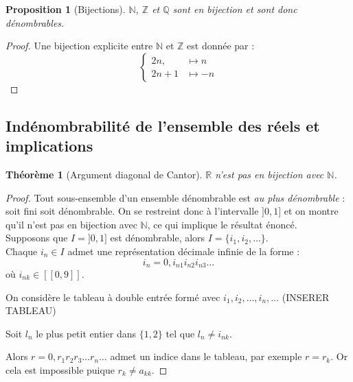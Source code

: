 \documentclass{article}
\theoremstyle{definition}
\theoremstyle{plain}
\newtheorem{proposition}[subsubsection]{Proposition}
\newtheorem{theorem}[subsubsection]{Théorème}
\theoremstyle{plain}
\theoremstyle{plain}
\theoremstyle{plain}
\theoremstyle{plain}
\begin{document}
\begin{proposition}[Bijections]
	\( \mathbb{N} \), \( \mathbb{Z} \) et \( \mathbb{Q} \) sont en bijection et sont donc dénombrables. \cite{tao2014analysis}
\end{proposition}
\begin{proof}
	Une bijection explicite entre \( \mathbb{N} \) et \( \mathbb{Z} \) est donnée par :
	\[
		\begin{cases}
			2n, & \mapsto n \\
			2n + 1 & \mapsto -n
		\end{cases}
	\]
\end{proof}

\subsection{Indénombrabilité de l'ensemble des réels et implications}

\begin{theorem}[Argument diagonal de Cantor]
	\( \mathbb{R} \) n'est pas en bijection avec \( \mathbb{N} \). \cite{aigner2018proofs} \cite{dehornoy2017théorie}
\end{theorem}
\begin{proof}
	Tout sous-ensemble d'un ensemble dénombrable est \textit{au plus dénombrable} : soit fini soit dénombrable. On se restreint donc à l'intervalle \( ]0,1] \) et on montre qu'il n'est pas en bijection avec \( \mathbb{N} \), ce qui implique le résultat énoncé. \\
	Supposons que \( I = ]0,1] \) est dénombrable, alors \( I = \{i_{1}, i_{2}, \ldots \} \). \\ 
	Chaque \( i_{n} \in I \) admet une représentation décimale infinie de la forme :
	\begin{equation*}
		i_{n} = 0,i_{n1}i_{n2}i_{n3}\ldots 
	\end{equation*}
	où \( i_{nk} \in [\![0,9]\!] \).

	On considère le tableau à double entrée formé avec \( i_{1}, i_{2}, \ldots, i_{n}, \ldots \) (INSERER TABLEAU)

	Soit \( l_{n} \) le plus petit entier dans \( \{1,2\}\) tel que \( l_{n} \neq i_{nk}\). 

	Alors \( r = 0,r_{1}r_{2}r_{3} \ldots r_{n}\ldots \) admet un indice dans le tableau, par exemple \( r = r_{k} \). Or cela est impossible puique \( r_{k} \neq a_{kk} \).
	
\end{proof}
\end{document}
